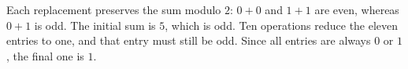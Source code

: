 Each replacement preserves the sum modulo $2$: $0+0$ and $1+1$ are even, whereas $0+1$ is odd. The initial sum is $5$, which is odd. Ten operations reduce the eleven entries to one, and that entry must still be odd. Since all entries are always $0$ or $1$, the final one is $\boxed1$.
